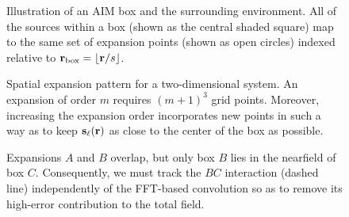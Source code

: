 \begin{figure}
  \centering
  
  \caption{\label{fig:aim terminology} Illustration of an AIM box and the surrounding environment.
    All of the sources within a box (shown as the central shaded square) map to the same set of expansion points (shown as open circles) indexed relative to $\vb{r}_\text{box} = \lfloor\vb{r}/s\rfloor$.
  }
\end{figure}

\begin{figure}
  \centering
  \caption{\label{fig:expansion grid}Spatial expansion pattern for a two-dimensional system.
    An expansion of order $m$ requires $(m + 1)^3$ grid points.
    Moreover, increasing the expansion order incorporates new points in such a way as to keep $\vb{s}_\ell(\vb{r})$ as close to the center of the box as possible.
  }
\end{figure}

\begin{figure}
  \centering
  \caption{\label{fig:nearfield correction}Expansions $A$ and $B$ overlap, but only box $B$ lies in the nearfield of box $C$.
    Consequently, we must track the $BC$ interaction (dashed line) independently of the FFT-based convolution so as to remove its high-error contribution to the total field.
  }
\end{figure}

